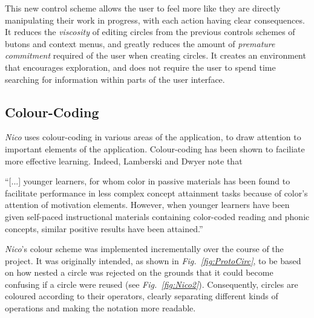\documentclass[12pt,twoside,notitlepage,xetex]{report}
\begin{document}
This new control scheme allows the user to feel more like they are directly manipulating their work in progress, with each action having clear consequences.  It reduces the \emph{viscosity} of editing circles from the previous controls schemes of butons and context menus, and greatly reduces the amount of \emph{premature commitment} required of the user when creating circles.  It creates an environment that encourages exploration, and does not require the user to spend time searching for information within parts of the user interface.

\subsection{Colour-Coding}

\emph{Nico} uses colour-coding in various areas of the application, to draw attention to important elements of the application.  Colour-coding has been shown to faciliate more effective learning.  Indeed, Lamberski and Dwyer note that
\begin{center}
\parbox[c]{\textwidth-2cm}{
\small
``[...] younger learners, for whom color in passive materials has been found to facilitate performance in less complex concept attainment tasks because of color's attention of motivation elements.  However, when younger learners have been given self-paced instructional materials containing color-coded reading and phonic concepts, similar positive results have been attained.'' \cite{Lamberski1983}
}
\end{center}
\emph{Nico}'s colour scheme was implemented incrementally over the course of the project.  It was originally intended, as shown in \emph{Fig.~\ref{fig:ProtoCirc}}, to be based on how nested a circle was rejected on the grounds that it could become confusing if a circle were reused (see \emph{Fig.~\ref{fig:Nico2}}).  Consequently, circles are coloured according to their operators, clearly separating different kinds of operations and making the notation more readable.
\end{document}

